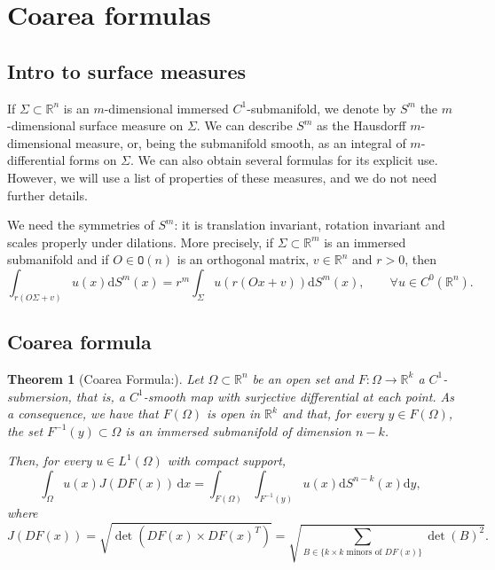 \documentclass[a4paper,9pt]{amsart}
\newcommand{\R}{\mathbb{R}}	%
\newcommand{\dd}{\mathrm{d}}	%
\newcommand{\did}{\,\mathrm{d}}	%
\newcommand{\Orth}{\mathtt{O}} %
\theoremstyle{plain}
\newtheorem{theorem}[proposition]{Theorem}
\theoremstyle{definition}
\theoremstyle{remark}
\begin{document}
\section{Coarea formulas}

\subsection{Intro to surface measures}
If $\Sigma\subset\R^n$ is an $m$-dimensional immersed $C^1$-submanifold,
we denote by $S^m$ the $m$-dimensional surface measure on $\Sigma$.
We can describe $S^m$ as the Hausdorff $m$-dimensional measure, or, being the submanifold smooth, as an integral of $m$-differential forms on $\Sigma$.
We can also obtain several formulas for its explicit use.
However, we will use a list of properties of these measures, and we do not need further details.

We need the symmetries of $S^m$: it is translation invariant, rotation invariant and scales properly under dilations. 
More precisely, if $\Sigma\subset\R^m$ is an immersed submanifold and if $O\in\Orth(n)$ is an orthogonal matrix, $v\in\R^n$ and $r>0$, then
\begin{equation}\label{eq67a718d1}
	\int_{r(O\Sigma + v)} u(x) \dd S^m(x) 
	= r^m \int_{\Sigma} u(r(Ox+v)) \dd S^m(x) ,
	\qquad\forall u\in C^0(\R^n) .
\end{equation}

\subsection{Coarea formula}
\begin{theorem}[Coarea Formula:{\cite[Theorem 2.93\& Remark 2.94]{MR1857292}}]\label{teo67a715db}
	Let $\Omega\subset\R^n$ be an open set and $F:\Omega\to\R^k$ a $C^1$-submersion, that is, a $C^1$-smooth map with surjective differential at each point.
	As a consequence, we have that $F(\Omega)$ is open in $\R^k$ and that, for every $y\in F(\Omega)$, the set $F^{-1}(y)\subset\Omega$ is an immersed submanifold of dimension $n-k$.
	
	Then, for every $u\in L^1(\Omega)$ with compact support,
	\begin{equation}\label{eq67a715e0}
		\int_\Omega u(x) J(DF(x)) \did x 
		= \int_{F(\Omega)} \int_{F^{-1}(y)} u(x) \dd S^{n-k}(x) \dd y ,
	\end{equation}
	where
	\begin{equation}\label{eq67a71bad}
		J(DF(x)) = \sqrt{ \det(DF(x)\times DF(x)^T) }
		= \sqrt{\sum_{B\in\{k\times k\text{ minors of }DF(x)\}} \det(B)^2 }  .
	\end{equation}
\end{theorem}
\end{document}
